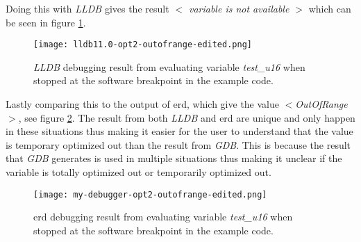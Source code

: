 Doing this with \emph{LLDB} gives the result  \emph{$<$ variable is not available $>$} which can be seen in figure \ref{fig:lldboutofrange}.


\begin{figure}[h]
	\centering
	\texttt{[image: lldb11.0-opt2-outofrange-edited.png]}
	\caption{\emph{LLDB} debugging result from evaluating variable \emph{test\_u16} when stopped at the software breakpoint in the example code.}
	\label{fig:lldboutofrange}
\end{figure}


Lastly comparing this to the output of \gls{erd}, which give the value \emph{$<$OutOfRange$>$}, see figure \ref{fig:mydebuggeroutofrange}.
The result from both \emph{LLDB} and \gls{erd} are unique and only happen in these situations thus making it easier for the user to understand that the value is temporary optimized out than the result from \emph{GDB}.
This is because the result that \emph{GDB} generates is used in multiple situations thus making it unclear if the variable is totally optimized out or temporarily optimized out.


\begin{figure}[h]
	\centering
	\texttt{[image: my-debugger-opt2-outofrange-edited.png]}
	\caption{\gls{erd} debugging result from evaluating variable \emph{test\_u16} when stopped at the software breakpoint in the example code.}
	\label{fig:mydebuggeroutofrange}
\end{figure}

